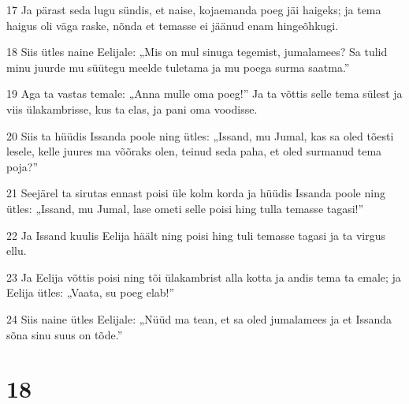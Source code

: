 \par 17 Ja pärast seda lugu sündis, et naise, kojaemanda poeg jäi haigeks; ja tema haigus oli väga raske, nõnda et temasse ei jäänud enam hingeõhkugi.
\par 18 Siis ütles naine Eelijale: „Mis on mul sinuga tegemist, jumalamees? Sa tulid minu juurde mu süütegu meelde tuletama ja mu poega surma saatma.”
\par 19 Aga ta vastas temale: „Anna mulle oma poeg!” Ja ta võttis selle tema sülest ja viis ülakambrisse, kus ta elas, ja pani oma voodisse.
\par 20 Siis ta hüüdis Issanda poole ning ütles: „Issand, mu Jumal, kas sa oled tõesti lesele, kelle juures ma võõraks olen, teinud seda paha, et oled surmanud tema poja?”
\par 21 Seejärel ta sirutas ennast poisi üle kolm korda ja hüüdis Issanda poole ning ütles: „Issand, mu Jumal, lase ometi selle poisi hing tulla temasse tagasi!”
\par 22 Ja Issand kuulis Eelija häält ning poisi hing tuli temasse tagasi ja ta virgus ellu.
\par 23 Ja Eelija võttis poisi ning tõi ülakambrist alla kotta ja andis tema ta emale; ja Eelija ütles: „Vaata, su poeg elab!”
\par 24 Siis naine ütles Eelijale: „Nüüd ma tean, et sa oled jumalamees ja et Issanda sõna sinu suus on tõde.”

\chapter{18}

